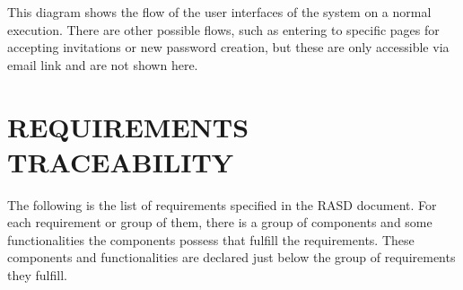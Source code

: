 \documentclass{article}
\begin{document}
This diagram shows the flow of the user interfaces of the system on a normal execution. There are other
possible flows, such as entering to specific pages for accepting invitations or new password creation, but
these are only accessible via email link and are not shown here.

\newpage

\section{REQUIREMENTS TRACEABILITY}

The following is the list of requirements specified in the RASD document. For each requirement or group of them,
there is a group of components and some functionalities the components possess that fulfill the requirements. These 
components and functionalities are declared just below the group of requirements they fulfill.
\end{document}
